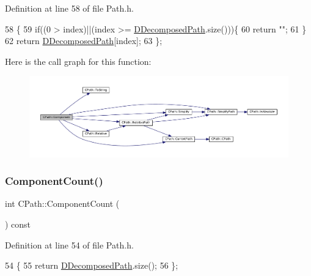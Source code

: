 Definition at line 58 of file Path.\+h.


\begin{DoxyCode}
58                                             \{
59             \textcolor{keywordflow}{if}((0 > index)||(index >= \hyperlink{classCPath_a03ed25209a01e633c107a0c877fc61f8}{DDecomposedPath}.size()))\{
60                 \textcolor{keywordflow}{return} \textcolor{stringliteral}{""};   
61             \}
62             \textcolor{keywordflow}{return} \hyperlink{classCPath_a03ed25209a01e633c107a0c877fc61f8}{DDecomposedPath}[index];  
63         \};
\end{DoxyCode}
Here is the call graph for this function\+:\nopagebreak
\begin{figure}[H]
\begin{center}
\leavevmode
\includegraphics[width=350pt]{classCPath_a7396f770babe0fbea344afa76d31da7c_cgraph}
\end{center}
\end{figure}
\hypertarget{classCPath_ab399818c519c46871306f9851dd8141d}{}\label{classCPath_ab399818c519c46871306f9851dd8141d} 
\subsubsection{\texorpdfstring{Component\+Count()}{ComponentCount()}}
{\footnotesize\ttfamily int C\+Path\+::\+Component\+Count (\begin{DoxyParamCaption}{ }\end{DoxyParamCaption}) const\hspace{0.3cm}{\ttfamily [inline]}}



Definition at line 54 of file Path.\+h.


\begin{DoxyCode}
54                                   \{
55             \textcolor{keywordflow}{return} \hyperlink{classCPath_a03ed25209a01e633c107a0c877fc61f8}{DDecomposedPath}.size();
56         \};
\end{DoxyCode}
\hypertarget{classCPath_a24d8c455b1663ce251d3a749437fa4fe}{}\label{classCPath_a24d8c455b1663ce251d3a749437fa4fe} 
